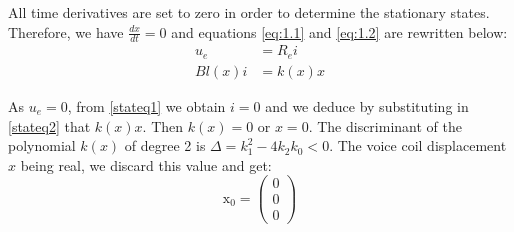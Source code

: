 All time derivatives are set to zero in order to determine the stationary states. Therefore, we have $\frac{dx}{dt} = 0$ and equations \eqref{eq:1.1} and \eqref{eq:1.2} are rewritten below:
\begin{align}
   u_{e} &= R_{e}i \label{stateq1} \\
   Bl(x)i &= k(x)x \label{stateq2}
\end{align}

As $u_{e} = 0$, from \eqref{stateq1} we obtain $i = 0$ and we deduce by substituting in \eqref{stateq2} that $k(x)x$. Then $k(x) = 0$ or $x = 0$. The discriminant of the polynomial $k(x)$ of degree 2 is $\Delta = k_{1}^2-4k_{2}k_{0} < 0$. The voice coil displacement $x$ being real, we discard this value and get:
\begin{equation*}
\text{x}_{0}=
\begin{pmatrix}
  0 \\
  0 \\
  0
\end{pmatrix}
\end{equation*}
